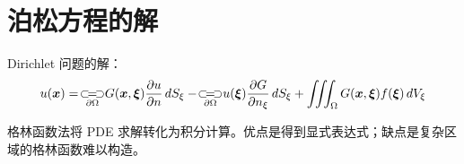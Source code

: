 \section{泊松方程的解}

\begin{theorem}[泊松公式]
Dirichlet 问题的解：
\[
u(\vect{x})=\oiint_{\partial\Omega}G(\vect{x},\vect{\xi})\frac{\partial u}{\partial n}\,dS_\xi-\oiint_{\partial\Omega}u(\vect{\xi})\frac{\partial G}{\partial n_\xi}\,dS_\xi+\iiint_\Omega G(\vect{x},\vect{\xi})f(\vect{\xi})\,dV_\xi
\]
\end{theorem}

\begin{remark}
格林函数法将 PDE 求解转化为积分计算。优点是得到显式表达式；缺点是复杂区域的格林函数难以构造。
\end{remark}
